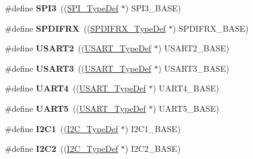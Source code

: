 \begin{DoxyCompactItemize}
\#define {\bfseries S\+P\+I3}~((\mbox{\hyperlink{struct_s_p_i___type_def}{S\+P\+I\+\_\+\+Type\+Def}} $\ast$) S\+P\+I3\+\_\+\+B\+A\+SE)
\item 
\mbox{\label{group___peripheral__declaration_gad8921b3f5c2dd101d153f5bb0a151dac}} 
\#define {\bfseries S\+P\+D\+I\+F\+RX}~((\mbox{\hyperlink{struct_s_p_d_i_f_r_x___type_def}{S\+P\+D\+I\+F\+R\+X\+\_\+\+Type\+Def}} $\ast$) S\+P\+D\+I\+F\+R\+X\+\_\+\+B\+A\+SE)
\item 
\mbox{\label{group___peripheral__declaration_gaf114a9eab03ca08a6fb720e511595930}} 
\#define {\bfseries U\+S\+A\+R\+T2}~((\mbox{\hyperlink{struct_u_s_a_r_t___type_def}{U\+S\+A\+R\+T\+\_\+\+Type\+Def}} $\ast$) U\+S\+A\+R\+T2\+\_\+\+B\+A\+SE)
\item 
\mbox{\label{group___peripheral__declaration_ga2350115553c1fe0a7bc14e6a7ec6a225}} 
\#define {\bfseries U\+S\+A\+R\+T3}~((\mbox{\hyperlink{struct_u_s_a_r_t___type_def}{U\+S\+A\+R\+T\+\_\+\+Type\+Def}} $\ast$) U\+S\+A\+R\+T3\+\_\+\+B\+A\+SE)
\item 
\mbox{\label{group___peripheral__declaration_ga7c035f6f443c999fc043b2b7fb598800}} 
\#define {\bfseries U\+A\+R\+T4}~((\mbox{\hyperlink{struct_u_s_a_r_t___type_def}{U\+S\+A\+R\+T\+\_\+\+Type\+Def}} $\ast$) U\+A\+R\+T4\+\_\+\+B\+A\+SE)
\item 
\mbox{\label{group___peripheral__declaration_ga9274e37cf5e8a174fc5dd627b98ec0fe}} 
\#define {\bfseries U\+A\+R\+T5}~((\mbox{\hyperlink{struct_u_s_a_r_t___type_def}{U\+S\+A\+R\+T\+\_\+\+Type\+Def}} $\ast$) U\+A\+R\+T5\+\_\+\+B\+A\+SE)
\item 
\mbox{\label{group___peripheral__declaration_gab45d257574da6fe1f091cc45b7eda6cc}} 
\#define {\bfseries I2\+C1}~((\mbox{\hyperlink{struct_i2_c___type_def}{I2\+C\+\_\+\+Type\+Def}} $\ast$) I2\+C1\+\_\+\+B\+A\+SE)
\item 
\mbox{\label{group___peripheral__declaration_gafa60ac20c1921ef1002083bb3e1f5d16}} 
\#define {\bfseries I2\+C2}~((\mbox{\hyperlink{struct_i2_c___type_def}{I2\+C\+\_\+\+Type\+Def}} $\ast$) I2\+C2\+\_\+\+B\+A\+SE)

\end{DoxyCompactItemize}
